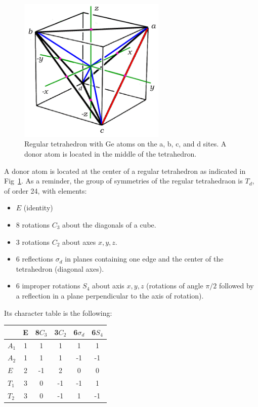 \begin{figure}[h]
  \centering
  \includegraphics[width=7cm]{xyzcube.png}
  \caption{Regular tetrahedron with Ge atoms on the a, b, c,
    and d sites. A donor atom is located in the middle of the tetrahedron.\label{fig:tetra}}
\end{figure}

A donor atom is located at the center of a regular tetrahedron as
indicated in Fig~\ref{fig:tetra}. As a reminder, the group of
symmetries of the regular tetrahedraon is $T_d$, of order 24, with elements:

\begin{itemize}
\item $E$ (identity)
\item 8 rotations  $C_3$ about the diagonals of a cube.
\item 3 rotations $C_2$ about axes $x, y , z$.
\item 6 reflections $\sigma_d$ in planes containing one edge and the center of
  the tetrahedron (diagonal axes).
\item 6 improper rotations $S_4$ about axis $x, y , z$ (rotations
of angle $\pi/2$ followed by a reflection in a plane perpendicular to
the axis of rotation).
\end{itemize}

Its character table is the following:

\begin{center}
 \begin{tabular}{|| l | *{5}{c} ||} 
 \hline
   & E & 8$C_3$ & 3$C_2$ & 6$\sigma_d$ & 6$S_4$ \\ [0.5ex] 
 \hline\hline
 $A_1$ & 1 & 1 & 1 & 1 & 1 \\ 
 \hline
 $A_2$ & 1 & 1 & 1 & -1 & -1 \\ 
 \hline
 $E$ & 2 & -1 & 2 & 0 & 0 \\ 
 \hline
 $T_1$ & 3 & 0 & -1 & -1 & 1 \\ 
 \hline
 $T_2$ & 3 & 0 & -1 & 1 & -1 \\
 \hline
\end{tabular}
\end{center}

